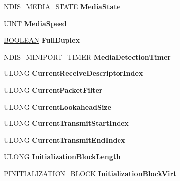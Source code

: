 \begin{DoxyCompactItemize}
N\+D\+I\+S\+\_\+\+M\+E\+D\+I\+A\+\_\+\+S\+T\+A\+TE {\bfseries Media\+State}
\item 
\mbox{\label{struct___a_d_a_p_t_e_r_a26233a4192c0ae37b18dced1c9e933e9}} 
U\+I\+NT {\bfseries Media\+Speed}
\item 
\mbox{\label{struct___a_d_a_p_t_e_r_a13948cdd7631053136932e799b465c46}} 
\hyperlink{_processor_bind_8h_a112e3146cb38b6ee95e64d85842e380a}{B\+O\+O\+L\+E\+AN} {\bfseries Full\+Duplex}
\item 
\mbox{\label{struct___a_d_a_p_t_e_r_a65091b8415f43409e8348d836ca5891b}} 
\hyperlink{struct___n_d_i_s___m_i_n_i_p_o_r_t___t_i_m_e_r}{N\+D\+I\+S\+\_\+\+M\+I\+N\+I\+P\+O\+R\+T\+\_\+\+T\+I\+M\+ER} {\bfseries Media\+Detection\+Timer}
\item 
\mbox{\label{struct___a_d_a_p_t_e_r_a62feedab0973d4076d803b9363fab7ec}} 
U\+L\+O\+NG {\bfseries Current\+Receive\+Descriptor\+Index}
\item 
\mbox{\label{struct___a_d_a_p_t_e_r_ab56d149bc2128725e251c2e76325983d}} 
U\+L\+O\+NG {\bfseries Current\+Packet\+Filter}
\item 
\mbox{\label{struct___a_d_a_p_t_e_r_a8904bf8516f11928add409f7047dd39a}} 
U\+L\+O\+NG {\bfseries Current\+Lookahead\+Size}
\item 
\mbox{\label{struct___a_d_a_p_t_e_r_aa5f5c37a46f0ab17e2a94ff80ddf32f5}} 
U\+L\+O\+NG {\bfseries Current\+Transmit\+Start\+Index}
\item 
\mbox{\label{struct___a_d_a_p_t_e_r_ace8237d14d20f4c025d3e9e1e1b25cd6}} 
U\+L\+O\+NG {\bfseries Current\+Transmit\+End\+Index}
\item 
\mbox{\label{struct___a_d_a_p_t_e_r_a3ab9ebbb0778bb99798112d9b6a32b0b}} 
U\+L\+O\+NG {\bfseries Initialization\+Block\+Length}
\item 
\mbox{\label{struct___a_d_a_p_t_e_r_ac3714f54257509e0feee300831ee0e7d}} 
\hyperlink{struct___i_n_i_t_i_a_l_i_z_a_t_i_o_n___b_l_o_c_k}{P\+I\+N\+I\+T\+I\+A\+L\+I\+Z\+A\+T\+I\+O\+N\+\_\+\+B\+L\+O\+CK} {\bfseries Initialization\+Block\+Virt}

\end{DoxyCompactItemize}
